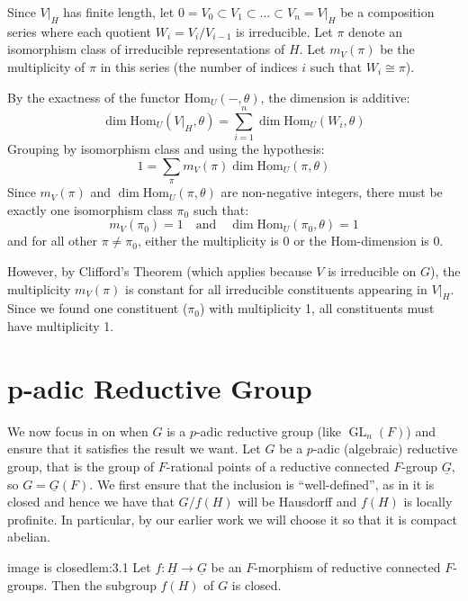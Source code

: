 \documentclass{article}
\newcommand{\GL}{{\operatorname{GL}}}
\begin{document}
\begin{Proof}
  Since $V|_H$ has finite length, let $0 = V_0 \subset V_1 \subset \dots \subset V_n = V|_H$ be a composition series where each quotient $W_i = V_i/V_{i-1}$ is irreducible.
  Let $\pi$ denote an isomorphism class of irreducible representations of $H$. Let $m_V(\pi)$ be the multiplicity of $\pi$ in this series (the number of indices $i$ such that $W_i \cong \pi$).

  By the exactness of the functor $\mathrm{Hom}_U(-, \theta)$, the dimension is additive:
  \[
    \dim \mathrm{Hom}_U(V|_H, \theta) = \sum_{i=1}^n \dim \mathrm{Hom}_U(W_i, \theta)
  \]
  Grouping by isomorphism class and using the hypothesis:
  \[
    1 = \sum_{\pi} m_V(\pi) \dim \mathrm{Hom}_U(\pi, \theta)
  \]
  Since $m_V(\pi)$ and $\dim \mathrm{Hom}_U(\pi, \theta)$ are non-negative integers, there must be exactly one isomorphism class $\pi_0$ such that:
  \[ m_V(\pi_0) = 1 \quad \text{and} \quad \dim \mathrm{Hom}_U(\pi_0, \theta) = 1 \]
  and for all other $\pi \neq \pi_0$, either the multiplicity is 0 or the Hom-dimension is 0.

  However, by Clifford's Theorem (which applies because $V$ is irreducible on $G$), the multiplicity $m_V(\pi)$ is constant for all irreducible constituents appearing in $V|_H$. Since we found one constituent ($\pi_0$) with multiplicity 1, all constituents must have multiplicity 1.
\end{Proof}

\section{p-adic Reductive Group}

We now focus in on when $G$ is a $p$-adic reductive group (like $\GL_n(F)$) and ensure that it satisfies the result we want.
Let $G$ be a $p$-adic (algebraic) reductive group, that is the group of $F$-rational points of a reductive
connected $F$-group $\underline{G}$, so $G= \underline{G}(F)$. We first ensure that the inclusion is
``well-defined'', as in it is closed and hence we have that $G/f(H)$ will be Hausdorff and $f(H)$ is locally
profinite. In particular, by our earlier work we will choose it so that it is compact abelian.

\begin{lem}{image is closed}{lem:3.1}
    Let $f : \underline{H} \to \underline{G}$ be an $F$-morphism of reductive connected $F$-groups. Then the subgroup $f(H)$ of $G$ is closed.
\end{lem}
\end{document}

